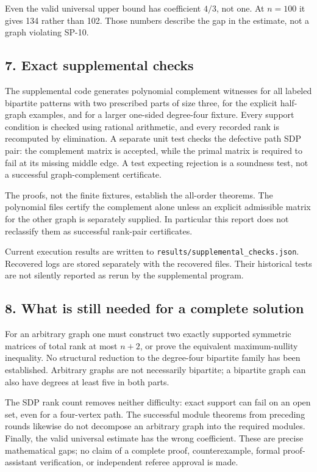 \documentclass[
  10pt,
]{article}
\begin{document}
Even the valid universal upper bound has coefficient \(4/3\), not one.
At \(n=100\) it gives 134 rather than 102. Those numbers describe the
gap in the estimate, not a graph violating SP-10.

\subsection{7. Exact supplemental
checks}\label{exact-supplemental-checks}

The supplemental code generates polynomial complement witnesses for all
labeled bipartite patterns with two prescribed parts of size three, for
the explicit half-graph examples, and for a larger one-sided degree-four
fixture. Every support condition is checked using rational arithmetic,
and every recorded rank is recomputed by elimination. A separate unit
test checks the defective path SDP pair: the complement matrix is
accepted, while the primal matrix is required to fail at its missing
middle edge. A test expecting rejection is a soundness test, not a
successful graph-complement certificate.

The proofs, not the finite fixtures, establish the all-order theorems.
The polynomial files certify the complement alone unless an explicit
admissible matrix for the other graph is separately supplied. In
particular this report does not reclassify them as successful rank-pair
certificates.

Current execution results are written to
\nolinkurl{results/supplemental_checks.json}. Recovered logs are stored
separately with the recovered files. Their historical tests are not
silently reported as rerun by the supplemental program.

\subsection{8. What is still needed for a complete
solution}\label{what-is-still-needed-for-a-complete-solution}

For an arbitrary graph one must construct two exactly supported
symmetric matrices of total rank at most \(n+2\), or prove the
equivalent maximum-nullity inequality. No structural reduction to the
degree-four bipartite family has been established. Arbitrary graphs are
not necessarily bipartite; a bipartite graph can also have degrees at
least five in both parts.

The SDP rank count removes neither difficulty: exact support can fail on
an open set, even for a four-vertex path. The successful module theorems
from preceding rounds likewise do not decompose an arbitrary graph into
the required modules. Finally, the valid universal estimate has the
wrong coefficient. These are precise mathematical gaps; no claim of a
complete proof, counterexample, formal proof-assistant verification, or
independent referee approval is made.
\end{document}

